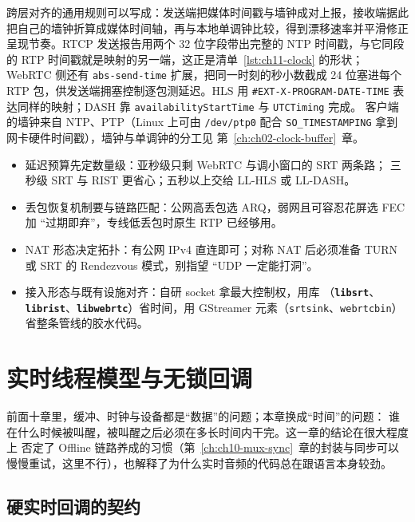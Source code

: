 \documentclass[12pt,a4paper,fontset=fandol]{ctexbook}
\newcommand{\Tp}[1]{\texttt{#1}}
\newcommand{\Lib}[1]{\textbf{\texttt{#1}}}
\newcommand{\Lang}[1]{\textsf{#1}}
\newcommand{\DomBatch}{\Lang{Offline}}
\begin{document}
跨层对齐的通用规则可以写成：发送端把媒体时间戳与墙钟成对上报，接收端据此
把自己的墙钟折算成媒体时间轴，再与本地单调钟比较，得到漂移速率并平滑修正
呈现节奏。RTCP 发送报告用两个 32 位字段带出完整的 NTP 时间戳，与它同段的
RTP 时间戳就是映射的另一端，这正是清单~\ref{lst:ch11-clock} 的形状；
WebRTC 侧还有 \Tp{abs-send-time} 扩展，把同一时刻的秒小数截成 24 位塞进每个
RTP 包，供发送端拥塞控制逐包测延迟。HLS 用 \Tp{\#EXT-X-PROGRAM-DATE-TIME}
表达同样的映射；DASH 靠 \Tp{availabilityStartTime} 与 \Tp{UTCTiming} 完成。
客户端的墙钟来自 NTP、PTP（Linux 上可由 \Tp{/dev/ptp0} 配合
\Tp{SO\_TIMESTAMPING} 拿到网卡硬件时间戳），墙钟与单调钟的分工见
第~\ref{ch:ch02-clock-buffer}~章。

\begin{guideline}[title={传输层选型的四条判据}]
\begin{itemize}
  \item 延迟预算先定数量级：亚秒级只剩 WebRTC 与调小窗口的 SRT 两条路；
        三秒级 SRT 与 RIST 更省心；五秒以上交给 LL-HLS 或 LL-DASH。
  \item 丢包恢复机制要与链路匹配：公网高丢包选 ARQ，弱网且可容忍花屏选
        FEC 加 ``过期即弃''，专线低丢包时原生 RTP 已经够用。
  \item NAT 形态决定拓扑：有公网 IPv4 直连即可；对称 NAT 后必须准备 TURN
        或 SRT 的 Rendezvous 模式，别指望 ``UDP 一定能打洞''。
  \item 接入形态与既有设施对齐：自研 socket 拿最大控制权，用库
        （\Lib{libsrt}、\Lib{librist}、\Lib{libwebrtc}）省时间，用 GStreamer
        元素（\Tp{srtsink}、\Tp{webrtcbin}）省整条管线的胶水代码。
\end{itemize}
\end{guideline}

\chapter{实时线程模型与无锁回调}
\label{ch:ch12-realtime-thread}

前面十章里，缓冲、时钟与设备都是``数据''的问题；本章换成``时间''的问题：
谁在什么时候被叫醒，被叫醒之后必须在多长时间内干完。这一章的结论在很大程度上
否定了 \DomBatch{} 链路养成的习惯（第~\ref{ch:ch10-mux-sync}~章的封装与同步可以
慢慢重试，这里不行），也解释了为什么实时音频的代码总在跟语言本身较劲。

\section{硬实时回调的契约}
\end{document}
